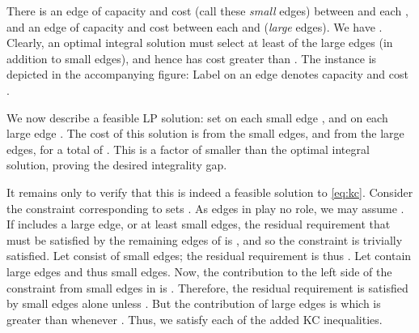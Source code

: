\documentclass[11pt]{article}
\def\KCLP{\eqref{eq:kc}\xspace}
\begin{document}

\noindent There is an edge of capacity  and cost  (call these
\emph{small} edges) between  and each , and an edge of
capacity  and cost  between each  and  (\emph{large}
edges). We have . Clearly, an optimal integral solution
must select at least  of the large edges (in addition to small
edges), and hence has cost greater than .  The instance is
depicted in the accompanying figure: Label  on an edge denotes
capacity  and cost .




We now describe a feasible LP solution: set  on each small
edge , and  on each large edge . The cost of this
solution is  from the small edges, and  from the large edges,
for a total of . This is a factor of  smaller
than the optimal integral solution, proving the desired integrality
gap.

\medskip
It remains only to verify that this is indeed a feasible solution to
\KCLP. Consider the constraint corresponding to sets . As edges
in  play no role, we may assume . If  includes a large edge, or at least  small
edges, the residual requirement  that must be satisfied by the
remaining edges of  is , and so the constraint is
trivially satisfied. Let  consist of  small edges; the
residual requirement is thus . Let  contain  large
edges and thus  small edges. Now, the contribution to the left
side of the constraint from small edges in  is
. Therefore, the residual
requirement is satisfied by small edges alone unless .  But
the contribution of large edges is 
which is greater than  whenever . Thus, we satisfy each
of the added KC inequalities.
\end{document}

